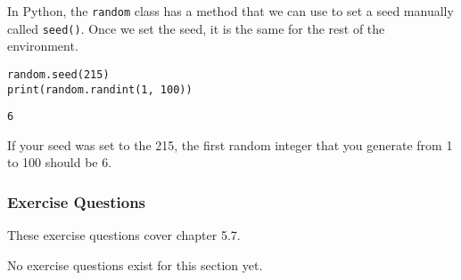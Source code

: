 In Python, the \verb|random| class has a method that we can use to set a seed manually called \verb|seed()|. Once we set the seed, it is the same for the rest of the environment.\par
\begin{lstlisting}[style=pippython]
random.seed(215)
print(random.randint(1, 100))
\end{lstlisting}
\begin{lstlisting}[style=none]
6
\end{lstlisting}
If your seed was set to the 215, the first random integer that you generate from 1 to 100 should be 6.

\subsubsection*{Exercise Questions}
These exercise questions cover chapter 5.7.

No exercise questions exist for this section yet.